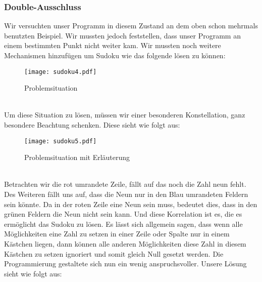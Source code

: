 \documentclass[11pt,a4paper]{article}
\begin{document}
\subsubsection{Double-Ausschluss}
Wir versuchten unser Programm in diesem Zustand an dem oben schon mehrmals benutzten Beispiel. Wir mussten jedoch feststellen, dass unser Programm an einem bestimmten Punkt nicht weiter kam.
Wir mussten noch weitere Mechanismen hinzufügen um Sudoku wie das folgende lösen zu können:
\ \\
\begin{figure}[htbp!]
\begin{center}
\texttt{[image: sudoku4.pdf]}
\end{center}
\caption{Problemsituation}
\end{figure}
\ \\ 
\newpage
Um diese Situation zu lösen, müssen wir einer besonderen Konstellation, ganz besondere Beachtung schenken. Diese sieht wie folgt aus: 
\ \\
\begin{figure}[htbp!]
\begin{center}
\texttt{[image: sudoku5.pdf]}
\end{center}
\caption{Problemsituation mit Erläuterung}
\end{figure}
\ \\ 
Betrachten wir die rot umrandete Zeile, fällt auf das noch die Zahl neun fehlt. Des Weiteren fällt uns auf, dass die Neun nur in den Blau umrandeten Feldern sein könnte. Da in der roten Zeile eine Neun sein muss, bedeutet dies, dass in den grünen Feldern die Neun nicht sein kann. Und diese Korrelation ist es, die es ermöglicht das Sudoku zu lösen. Es lässt sich allgemein sagen, dass wenn alle Möglichkeiten eine Zahl zu setzen in einer Zeile oder Spalte nur in einem Kästchen liegen, dann können alle anderen Möglichkeiten diese Zahl in diesem Kästchen zu setzen ignoriert und somit gleich Null gesetzt werden.
Die Programmierung gestaltete sich nun ein wenig anspruchsvoller. Unsere Lösung sieht wie folgt aus:
\ \\
\end{document}
